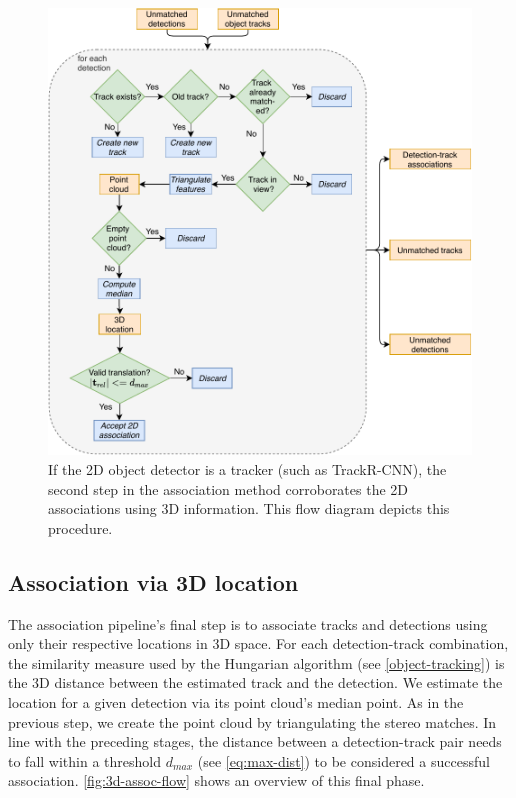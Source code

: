 \documentclass[headsepline, hidelinks, footsepline, footinclude=false, oneside, fontsize=11pt, paper=a4, listof=totoc, bibliography=totoc]{scrbook}
\begin{document}
\begin{figure}[htbp]
\centering
\includegraphics[width=.9\linewidth]{figures/match_detections_tracks_2d.pdf}
\caption{\label{fig:2d-corroborated-flow}If the 2D object detector is a tracker (such as TrackR-CNN), the second step in the association method corroborates the 2D associations using 3D information. This flow diagram depicts this procedure.}
\end{figure}

\subsection{Association via 3D location}
\label{sec:org14836d6}
    The association pipeline's final step is to associate tracks and detections using only their respective locations in 3D space.
For each detection-track combination, the similarity measure used by the Hungarian algorithm (see \cref{object-tracking}) is the 3D distance between the estimated track and the detection.
We estimate the location for a given detection via its point cloud's median point. As in the previous step, we create the point cloud by triangulating the stereo matches.
In line with the preceding stages, the distance between a detection-track pair needs to fall within a threshold \(d_{max}\) (see \cref{eq:max-dist}) to be considered a successful association. 
\cref{fig:3d-assoc-flow} shows an overview of this final phase.
\end{document}
